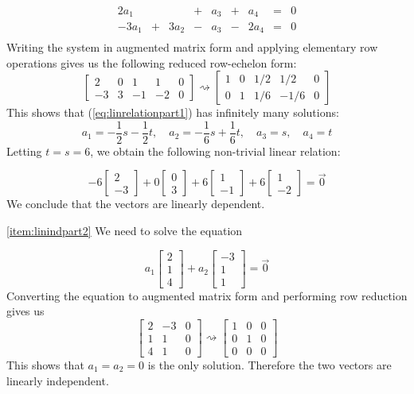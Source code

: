 \documentclass{ximera}
\begin{document}
\begin{example}
\begin{explanation}
$$\begin{array}{ccccccccc}
      2a_1 & &&+&a_3&+&a_4&= &0 \\
        -3a_1& +&3a_2&-&a_3&-&2a_4&= &0 \\
      \end{array}$$
  Writing the system in augmented matrix form and applying elementary row operations gives us the following reduced row-echelon form:
  $$\left[\begin{array}{cccc|c}  
 2&0&1&1&0\\-3&3&-1&-2&0
 \end{array}\right]\rightsquigarrow\left[\begin{array}{cccc|c}  
 1&0&1/2&1/2&0\\0&1&1/6&-1/6&0
 \end{array}\right]$$
 This shows that (\ref{eq:linrelationpart1}) has infinitely many solutions:  
 $$a_1=-\frac{1}{2}s-\frac{1}{2}t,\quad a_2=-\frac{1}{6}s+\frac{1}{6}t,\quad a_3=s,\quad a_4=t$$
 Letting $t=s=6$, we obtain the following non-trivial linear relation:
 
 $$-6\begin{bmatrix}2\\-3\end{bmatrix}+0 \begin{bmatrix}0\\3\end{bmatrix}+6\begin{bmatrix}1\\-1\end{bmatrix}+6\begin{bmatrix}1\\-2\end{bmatrix}=\vec{0}$$
 We conclude that the vectors are linearly dependent.
 
 \ref{item:linindpart2} We need to solve the equation
 
 $$a_1\begin{bmatrix}2\\1\\4\end{bmatrix}+a_2\begin{bmatrix}-3\\1\\1\end{bmatrix}=\vec{0}$$
 Converting the equation to augmented matrix form and performing row reduction gives us
 $$\left[\begin{array}{cc|c}  
 2&-3&0\\1&1&0\\4&1&0
 \end{array}\right]\rightsquigarrow\left[\begin{array}{cc|c}  
 1&0&0\\0&1&0\\0&0&0
 \end{array}\right]$$
 This shows that $a_1=a_2=0$ is the only solution.  Therefore the two vectors are linearly independent.
\end{explanation}

\end{example}
\end{document}
